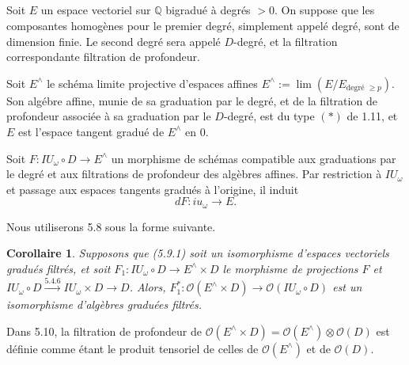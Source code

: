 \documentclass[11pt,a4paper]{article}
\theoremstyle{plain}
\newtheorem{corollary}[theorem]{Corollaire}
\theoremstyle{definition}
\newcommand{\Q}{\mathbb{Q}}
\begin{document}
\subsection{}
Soit $E$ un espace vectoriel sur $\Q$ bigradu\'e \`a degr\'es $> 0$. On suppose que les composantes homog\`enes pour le premier degr\'e, simplement appel\'e degr\'e, sont de dimension finie. Le second degr\'e sera appel\'e $D$-degr\'e, et la filtration correspondante filtration de profondeur.

Soit $E^{\wedge}$ le sch\'ema limite projective d'espaces affines $E^{\wedge} := \lim(E/E_{\text{degr\'e } \geq p})$. Son alg\'ebre affine, munie de sa graduation par le degr\'e, et de la filtration de profondeur associ\'ee \`a sa graduation par le $D$-degr\'e, est du type $(\ast)$ de 1.11, et $E$ est l'espace tangent gradu\'e de $E^{\wedge}$ en $0$.

Soit $F: IU_\omega \circ D \to E^{\wedge}$ un morphisme de sch\'emas compatible aux graduations par le degr\'e et aux filtrations de profondeur des alg\`ebres affines. Par restriction \`a $IU_\omega$ et passage aux espaces tangents gradu\'es \`a l'origine, il induit
\begin{equation}\label{eq:5.9.1}
dF: iu_\omega \to E.
\end{equation}

Nous utiliserons 5.8 sous la forme suivante.

\begin{corollary}\label{cor:5.10}
Supposons que (5.9.1) soit un isomorphisme d'espaces vectoriels gradu\'es filtr\'es, et soit $F_1: IU_\omega \circ D \to E^{\wedge} \times D$ le morphisme de projections $F$ et $IU_\omega \circ D \xrightarrow{5.4.6} IU_\omega \times D \to D$. Alors, $F_1^*: \mathcal{O}(E^{\wedge} \times D) \to \mathcal{O}(IU_\omega \circ D)$ est un isomorphisme d'alg\`ebres gradu\'ees filtr\'es.
\end{corollary}

Dans 5.10, la filtration de profondeur de $\mathcal{O}(E^{\wedge} \times D) = \mathcal{O}(E^{\wedge}) \otimes \mathcal{O}(D)$ est d\'efinie comme \'etant le produit tensoriel de celles de $\mathcal{O}(E^{\wedge})$ et de $\mathcal{O}(D)$.
\end{document}
